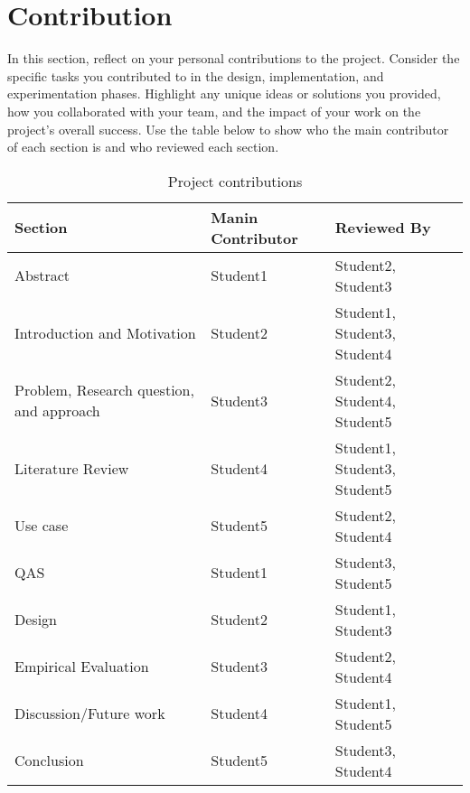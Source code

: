 \documentclass[conference, onecolumn]{IEEEtran}
\begin{document}
\maketitle
\IEEEpubidadjcol


\section{Contribution}
In this section, reflect on your personal contributions to the project.
Consider the specific tasks you contributed to in the design, implementation, and experimentation phases.
Highlight any unique ideas or solutions you provided, how you collaborated with your team, and the impact of your work on the project's overall success.
Use the table below to show who the main contributor of each section is and who reviewed each section.

\begin{table}[H]
    \centering
    \begin{tabular}{|l|l|l|}
    \toprule
                                     Section & Manin Contributor &           Reviewed By \\
    \midrule
                                    Abstract &   Student1 &           Student2, Student3 \\
                 Introduction and Motivation &   Student2 & Student1, Student3, Student4 \\
    Problem, Research question, and approach &   Student3 & Student2, Student4, Student5 \\
                           Literature Review &   Student4 & Student1, Student3, Student5 \\
                                    Use case &   Student5 &           Student2, Student4 \\
                                         QAS &   Student1 &           Student3, Student5 \\
                                      Design &   Student2 &           Student1, Student3 \\
                        Empirical Evaluation &   Student3 &           Student2, Student4 \\
                      Discussion/Future work &   Student4 &           Student1, Student5 \\
                                  Conclusion &   Student5 &           Student3, Student4 \\
    \bottomrule
    \end{tabular}
    \caption{Project contributions}
    \label{tab:project_contributions}
\end{table}
\end{document}
